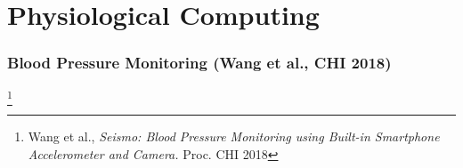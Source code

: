 \documentclass{beamer}
\begin{document}
\section{Physiological Computing}

\begin{frame}
\frametitle{Blood Pressure Monitoring (Wang et al.,  CHI 2018)}


\footnote{Wang et al., \textit{Seismo: Blood Pressure Monitoring using Built-in Smartphone Accelerometer and Camera.}  Proc. CHI 2018}

\end{frame}

\end{document}
